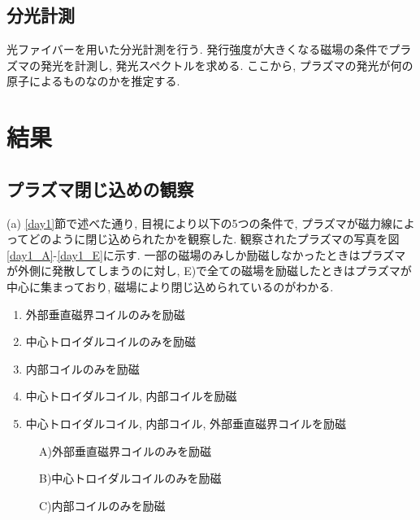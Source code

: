 \documentclass[]{jsarticle}
\begin{document}
	\subsection{分光計測}
	光ファイバーを用いた分光計測を行う. 発行強度が大きくなる磁場の条件でプラズマの発光を計測し, 発光スペクトルを求める. ここから, プラズマの発光が何の原子によるものなのかを推定する. 

\section{結果\label{results}}
	\subsection{プラズマ閉じ込めの観察\label{day1_results}}
	(a) \ref{day1}節で述べた通り, 目視により以下の5つの条件で, プラズマが磁力線によってどのように閉じ込められたかを観察した. 観察されたプラズマの写真を図\ref{day1_A}-\ref{day1_E}に示す. 一部の磁場のみしか励磁しなかったときはプラズマが外側に発散してしまうのに対し, E)で全ての磁場を励磁したときはプラズマが中心に集まっており, 磁場により閉じ込められているのがわかる. 
	\begin{enumerate}
		\renewcommand{\labelenumi}{\Alph{enumi})}
		\item 外部垂直磁界コイルのみを励磁
		\item 中心トロイダルコイルのみを励磁
		\item 内部コイルのみを励磁
		\item 中心トロイダルコイル, 内部コイルを励磁
		\item 中心トロイダルコイル, 内部コイル, 外部垂直磁界コイルを励磁
	\end{enumerate}

	\begin{figure}[htbp]
		\begin{minipage}{0.33\hsize}
			\begin{center}
				\caption{A)外部垂直磁界コイルのみを励磁}
				\label{day1_A}
			\end{center}
		\end{minipage}
		\begin{minipage}{0.33\hsize}
			\begin{center}
				\caption{B)中心トロイダルコイルのみを励磁}
				\label{day1_B}
			\end{center}
		\end{minipage}
		\begin{minipage}{0.33\hsize}
			\begin{center}
				\caption{C)内部コイルのみを励磁}
				\label{day1_C}
			\end{center}
		\end{minipage}
		
	\end{figure}
	
\end{document}
